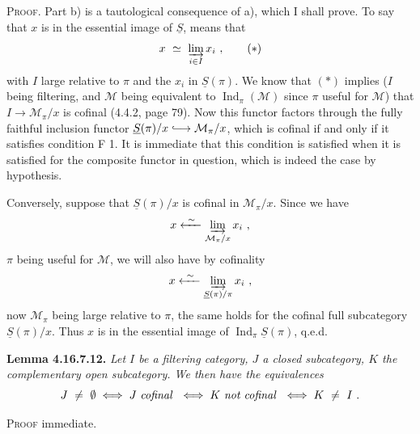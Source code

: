 \documentclass[11pt]{article}
\newcommand{\printedpage}[1]{\marginpar{\footnotesize p.~#1}}
\newcommand{\msp}[1]{\marginpar{\footnotesize [#1]}}
\newcommand{\cM}{\mathcal{M}}
\newcommand{\Ind}{\operatorname{Ind}}
\newcommand{\incl}{\lhook\joinrel\longrightarrow}
\begin{document}
\noindent\textsc{Proof}. Part b) is a tautological consequence of a), which I shall prove. To say that $x$ is in the essential image of $\underline{S}$, means that
\[
x \ \simeq \ \varinjlim_{i\in I} x_i \ , \tag*{$(*)$}
\]
with $I$ large relative to $\pi$ and the $x_i$ in $\underline{S}(\pi)$. We know that $(*)$ implies ($I$ being filtering, and $\cM$ being equivalent to $\Ind_\pi(\cM)$ since $\pi$ useful for $\cM$) that $I\longrightarrow\cM_\pi/x$ is cofinal (4.4.2, page 79). Now this functor factors through the fully faithful inclusion functor $\underline{S}(\pi)/x\incl\cM_\pi/x$, which is cofinal if and only if it satisfies condition F 1. It is immediate that this condition is satisfied when it is satisfied for the composite functor in question, which is indeed the case
\printedpage{190}
\msp{page 490}
by hypothesis.

\noindent Conversely, suppose that $\underline{S}(\pi)/x$ is cofinal in $\cM_\pi/x$. Since we have
\[
x \xleftarrow{\ \sim\ } \varinjlim_{\cM_\pi/x} x_i \ ,
\]
$\pi$ being useful for $\cM$, we will also have by cofinality
\[
x \xleftarrow{\ \sim\ } \varinjlim_{\underline{S}(\pi)/\pi} x_i \ , %
\]
now $\cM_\pi$ being large relative to $\pi$, the same holds for the cofinal full subcategory $\underline{S}(\pi)/x$. Thus $x$ is in the essential image of $\Ind_\pi\underline{S}(\pi)$, q.e.d.

\noindent\textbf{Lemma 4.16.7.12.} \textit{Let $I$ be a filtering category, $J$ a closed subcategory, $K$ the complementary open subcategory. We then have the equivalences}
\[
J \ \neq \ \emptyset \iff J \text{ \textit{cofinal} } \iff K \text{ \textit{not cofinal} } \iff K \ \neq \ I \ .
\]

\noindent\textsc{Proof} immediate.
\end{document}
